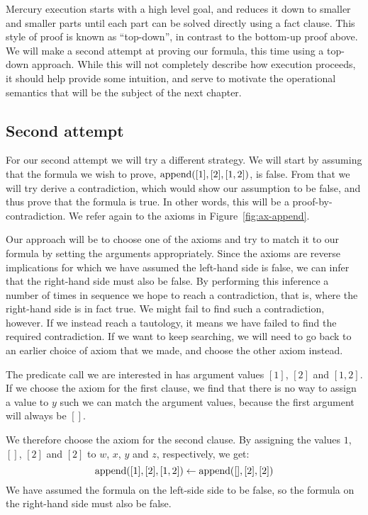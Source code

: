 Mercury execution starts with a high level goal,
and reduces it down to smaller and smaller parts
until each part can be solved directly using a fact clause.
This style of proof is known as ``top-down'',
in contrast to the bottom-up proof above.
We will make a second attempt at proving our formula,
this time using a top-down approach.
While this will not completely describe how execution proceeds,
it should help provide some intuition,
and serve to motivate the operational semantics
that will be the subject of the next chapter.


\subsection*{Second attempt}
\label{sec:reasoning2}

For our second attempt we will try a different strategy.
We will start by assuming that the formula we wish to prove,
$\operatorname{append}([1], [2], [1, 2])$, is false.
From that we will try derive a contradiction,
which would show our assumption to be false,
and thus prove that the formula is true.
In other words,
this will be a proof-by-contradiction.
We refer again to the axioms in Figure~\ref{fig:ax-append}.

Our approach will be to choose one of the axioms
and try to match it to our formula
by setting the arguments appropriately.
Since the axioms are reverse implications
for which we have assumed the left-hand side is false,
we can infer that the right-hand side must also be false.
By performing this inference a number of times in sequence
we hope to reach a contradiction,
that is, where the right-hand side is in fact true.
We might fail to find such a contradiction, however.
If we instead reach a tautology,
it means we have failed to find the required contradiction.
If we want to keep searching,
we will need to go back to an earlier choice of axiom that we made,
and choose the other axiom instead.

The predicate call we are interested in
has argument values $[1]$, $[2]$ and $[1, 2]$.
If we choose the axiom for the first clause,
we find that there is no way to assign a value to $y$
such we can match the argument values,
because the first argument will always be $[]$.

We therefore choose the axiom for the second clause.
By assigning the values
$1$, $[]$, $[2]$ and $[2]$
to $w$, $x$, $y$ and $z$, respectively,
we get:
\[
    \operatorname{append}([1], [2], [1, 2]) \leftarrow \operatorname{append}([], [2], [2])
\]
We have assumed the formula on the left-side side to be false,
so the formula on the right-hand side must also be false.

